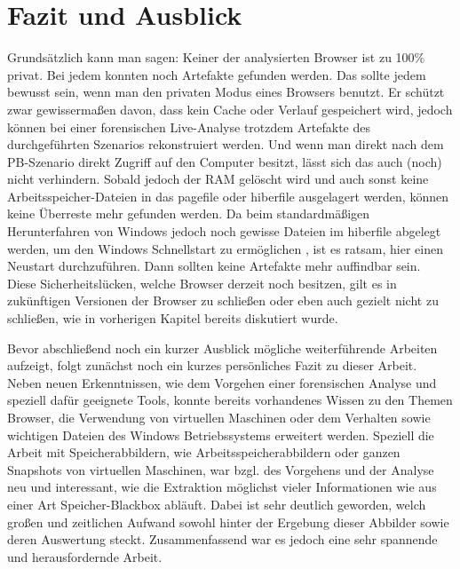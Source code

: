 \chapter{Fazit und Ausblick}\label{chap:Fazit-Ausblick}
\thispagestyle{plain.scrheadings}
\ohead{\headmark}

Grundsätzlich kann man sagen: Keiner der analysierten Browser ist zu 100\% privat. Bei jedem konnten noch Artefakte gefunden werden. Das sollte jedem bewusst sein, wenn man den privaten Modus eines Browsers benutzt. Er schützt zwar gewissermaßen davon, dass kein Cache oder Verlauf gespeichert wird, jedoch können bei einer forensischen Live-Analyse trotzdem Artefakte des durchgeführten Szenarios rekonstruiert werden. Und wenn man direkt nach dem PB-Szenario direkt Zugriff auf den Computer besitzt, lässt sich das auch (noch) nicht verhindern. Sobald jedoch der RAM gelöscht wird und auch sonst keine Arbeitsspeicher-Dateien in das pagefile oder hiberfile ausgelagert werden, können keine Überreste mehr gefunden werden. Da beim standardmäßigen Herunterfahren von Windows jedoch noch gewisse Dateien im hiberfile abgelegt werden, um den Windows Schnellstart zu ermöglichen \cite{hiberfile}, ist es ratsam, hier einen Neustart durchzuführen. Dann sollten keine Artefakte mehr auffindbar sein.\\
Diese Sicherheitslücken, welche Browser derzeit noch besitzen, gilt es in zukünftigen Versionen der Browser zu schließen oder eben auch gezielt nicht zu schließen, wie in vorherigen Kapitel bereits diskutiert wurde.

Bevor abschließend noch ein kurzer Ausblick mögliche weiterführende Arbeiten aufzeigt, folgt zunächst noch ein kurzes persönliches Fazit zu dieser Arbeit.\\
Neben neuen Erkenntnissen, wie dem Vorgehen einer forensischen Analyse und speziell dafür geeignete Tools, konnte bereits vorhandenes Wissen zu den Themen Browser, die Verwendung von virtuellen Maschinen oder dem Verhalten sowie wichtigen Dateien des Windows Betriebssystems erweitert werden. Speziell die Arbeit mit Speicherabbildern, wie Arbeitsspeicherabbildern oder ganzen Snapshots von virtuellen Maschinen, war bzgl. des Vorgehens und der Analyse neu und interessant, wie die Extraktion möglichst vieler Informationen wie aus einer Art Speicher-Blackbox abläuft. Dabei ist sehr deutlich geworden, welch großen und zeitlichen Aufwand sowohl hinter der Ergebung dieser Abbilder sowie deren Auswertung steckt. Zusammenfassend war es jedoch eine sehr spannende und herausfordernde Arbeit.

